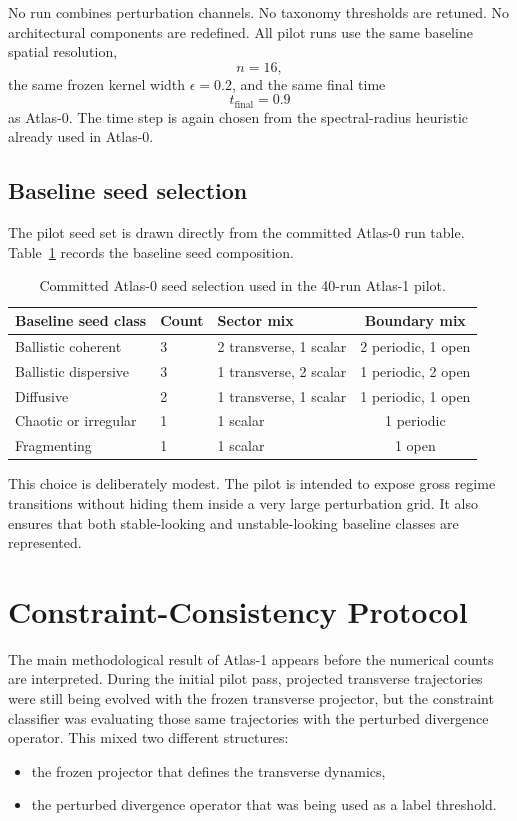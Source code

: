 \documentclass[11pt]{article}
\begin{document}
No run combines perturbation channels. No taxonomy thresholds are retuned. No architectural components are redefined. All pilot runs use the same baseline spatial resolution,
\begin{equation}
n = 16,
\end{equation}
the same frozen kernel width $\epsilon = 0.2$, and the same final time
\begin{equation}
t_{\mathrm{final}} = 0.9
\end{equation}
as Atlas-0. The time step is again chosen from the spectral-radius heuristic already used in Atlas-0.

\subsection{Baseline seed selection}
The pilot seed set is drawn directly from the committed Atlas-0 run table. Table~\ref{tab:pilot-seeds} records the baseline seed composition.

\begin{table}[t]
\centering
\begin{tabular}{lllc}
\hline
Baseline seed class & Count & Sector mix & Boundary mix \\
\hline
Ballistic coherent & 3 & 2 transverse, 1 scalar & 2 periodic, 1 open \\
Ballistic dispersive & 3 & 1 transverse, 2 scalar & 1 periodic, 2 open \\
Diffusive & 2 & 1 transverse, 1 scalar & 1 periodic, 1 open \\
Chaotic or irregular & 1 & 1 scalar & 1 periodic \\
Fragmenting & 1 & 1 scalar & 1 open \\
\hline
\end{tabular}
\caption{Committed Atlas-0 seed selection used in the 40-run Atlas-1 pilot.}
\label{tab:pilot-seeds}
\end{table}

This choice is deliberately modest. The pilot is intended to expose gross regime transitions without hiding them inside a very large perturbation grid. It also ensures that both stable-looking and unstable-looking baseline classes are represented.

\section{Constraint-Consistency Protocol}
The main methodological result of Atlas-1 appears before the numerical counts are interpreted. During the initial pilot pass, projected transverse trajectories were still being evolved with the frozen transverse projector, but the constraint classifier was evaluating those same trajectories with the perturbed divergence operator. This mixed two different structures:
\begin{itemize}
\item the frozen projector that defines the transverse dynamics,
\item the perturbed divergence operator that was being used as a label threshold.
\end{itemize}
\end{document}
